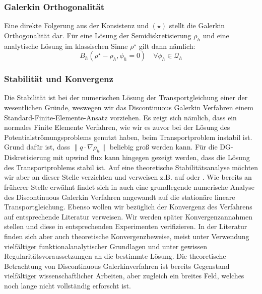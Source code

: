 \subsubsection{Galerkin Orthogonalität}
Eine direkte Folgerung aus der Konsistenz und $ (\star) $ stellt die Galerkin Orthogonalität dar. Für eine Lösung der Semidiskretisierung $ \rho_h $ und eine analytische Lösung im klassischen Sinne $ \rho^{\star} $ gilt dann nämlich:
\[
 B_h(\rho^{\star}-\rho_h,\phi_h = 0) \quad \forall \phi_h \in \mathcal{Q}_h
\]
\subsubsection{Stabilität und Konvergenz}
Die Stabilität ist bei der numerischen Lösung der Transportgleichung einer der wesentlichen Gründe, weswegen wir das Discontinuous Galerkin Verfahren einem Standard-Finite-Elemente-Ansatz vorziehen. Es zeigt sich nämlich, dass ein normales Finite Elemente Verfahren, wie wir es zuvor bei der Lösung des Potentialströmungsproblems genutzt haben, beim Transportproblem instabil ist. Grund dafür ist, dass $ \lVert q \cdot \nabla \rho_h \rVert $ beliebig groß werden kann. Für die DG-Diskretisierung mit upwind flux kann hingegen gezeigt werden, dass die Lösung des Transportproblems stabil ist. Auf eine theoretische Stabilitätsanalyse möchten wir aber an dieser Stelle verzichten und verweisen z.B. auf \cite{Har08b} oder \cite{ern2004theory}. Wie bereits an früherer Stelle erwähnt findet sich in \cite{Har08b} auch eine grundlegende numerische Analyse des Discontinuous Galerkin Verfahren angewandt auf die stationäre lineare Transportgleichung.
Ebenso wollen wir bezüglich der Konvergenz des Verfahrens auf entsprechende Literatur verweisen. Wir werden später Konvergenzannahmen stellen und diese in entsprechenden Experimenten verifizieren. In der Literatur finden sich aber auch theoretische Konvergenzbeweise, meist unter Verwendung vielfältiger funktionalanalytischer Grundlagen und unter gewissen Regularitätsvoraussetzungen an die bestimmte Lösung. Die theoretische Betrachtung von Discontinuous Galerkinverfahren ist bereits Gegenstand vielfältiger wissenschaftlicher Arbeiten, aber zugleich ein breites Feld, welches noch lange nicht vollständig erforscht ist. \\





